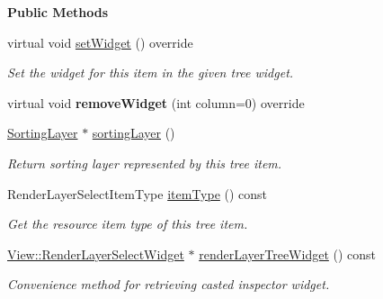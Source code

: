 \begin{Indent}\textbf{ Public Methods}\par
\begin{DoxyCompactItemize}
\item 
virtual void \mbox{\hyperlink{classrev_1_1_view_1_1_render_layer_select_item_aa2dd6d026ec2c87552cb56d678e6975c}{set\+Widget}} () override
\begin{DoxyCompactList}\small\item\em Set the widget for this item in the given tree widget. \end{DoxyCompactList}\item 
\mbox{\label{classrev_1_1_view_1_1_render_layer_select_item_a177e51d972056792cc9194c0ab317d52}} 
virtual void {\bfseries remove\+Widget} (int column=0) override
\item 
\mbox{\label{classrev_1_1_view_1_1_render_layer_select_item_ad4aa8dffcf29b149a249d999ab7098b3}} 
\mbox{\hyperlink{structrev_1_1_sorting_layer}{Sorting\+Layer}} $\ast$ \mbox{\hyperlink{classrev_1_1_view_1_1_render_layer_select_item_ad4aa8dffcf29b149a249d999ab7098b3}{sorting\+Layer}} ()
\begin{DoxyCompactList}\small\item\em Return sorting layer represented by this tree item. \end{DoxyCompactList}\item 
\mbox{\label{classrev_1_1_view_1_1_render_layer_select_item_a98eae7dafe710d7987109017c5e5cb96}} 
Render\+Layer\+Select\+Item\+Type \mbox{\hyperlink{classrev_1_1_view_1_1_render_layer_select_item_a98eae7dafe710d7987109017c5e5cb96}{item\+Type}} () const
\begin{DoxyCompactList}\small\item\em Get the resource item type of this tree item. \end{DoxyCompactList}\item 
\mbox{\label{classrev_1_1_view_1_1_render_layer_select_item_ad2345aca3e394b40a7ae244dceabc69a}} 
\mbox{\hyperlink{classrev_1_1_view_1_1_render_layer_select_widget}{View\+::\+Render\+Layer\+Select\+Widget}} $\ast$ \mbox{\hyperlink{classrev_1_1_view_1_1_render_layer_select_item_ad2345aca3e394b40a7ae244dceabc69a}{render\+Layer\+Tree\+Widget}} () const
\begin{DoxyCompactList}\small\item\em Convenience method for retrieving casted inspector widget. \end{DoxyCompactList}\end{DoxyCompactItemize}
\end{Indent}
